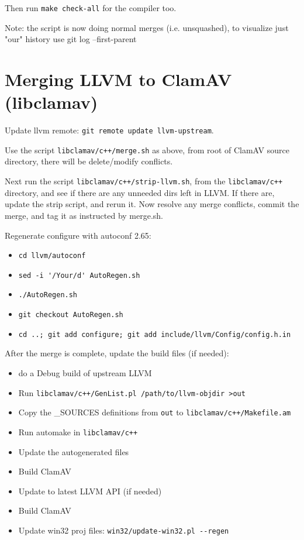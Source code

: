 Then run \verb+make check-all+ for the compiler too.

Note: the script is now doing normal merges (i.e. unsquashed), to visualize just
"our" history use git log --first-parent

\section{Merging LLVM to ClamAV (libclamav)}
Update llvm remote: \verb+git remote update llvm-upstream+.

Use the script \verb|libclamav/c++/merge.sh| as above, from root of ClamAV
source directory, there will be delete/modify conflicts.

Next run the script \verb|libclamav/c++/strip-llvm.sh|, from the
\verb|libclamav/c++| directory, and see if there are any
unneeded dirs left in LLVM. If there are, update the strip script, and rerun it.
Now resolve any merge conflicts, commit the merge, and tag it as instructed by
merge.sh.

Regenerate configure with autoconf 2.65:
\begin{itemize}
\item \verb+cd llvm/autoconf+
\item \verb+sed -i '/Your/d' AutoRegen.sh+
\item \verb+./AutoRegen.sh+
\item \verb+git checkout AutoRegen.sh+
\item \verb+cd ..; git add configure; git add include/llvm/Config/config.h.in+
\end{itemize}

After the merge is complete, update the build files (if needed):
\begin{itemize}
\item do a Debug build of upstream LLVM
\item Run \verb|libclamav/c++/GenList.pl /path/to/llvm-objdir >out|
\item Copy the \_SOURCES definitions from \verb+out+ to
\verb|libclamav/c++/Makefile.am|
\item Run automake in \verb|libclamav/c++|
\item Update the autogenerated files
\item Build ClamAV
\item Update to latest LLVM API (if needed)
\item Build ClamAV
\item Update win32 proj files: \verb+win32/update-win32.pl --regen+
\end{itemize}

